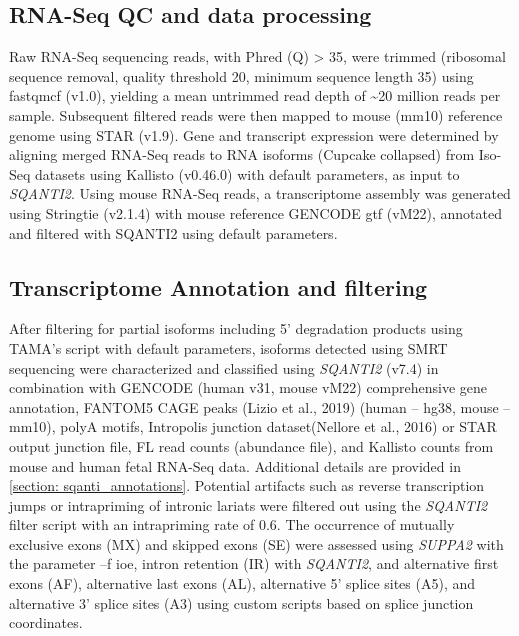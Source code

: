 \subsection{RNA-Seq QC and data processing}
Raw RNA-Seq sequencing reads, with Phred (Q) > 35, were trimmed (ribosomal sequence removal, quality threshold 20, minimum sequence length 35) using fastqmcf (v1.0), yielding a mean untrimmed read depth of \textasciitilde20 million reads per sample. Subsequent filtered reads were then mapped to mouse (mm10) reference genome using STAR\cite{Dobin2013} (v1.9). Gene and transcript expression were determined by aligning merged RNA-Seq reads to RNA isoforms (Cupcake collapsed) from Iso-Seq datasets using Kallisto\cite{Bray2016} (v0.46.0) with default parameters, as input to \textit{SQANTI2}. Using mouse RNA-Seq reads, a transcriptome assembly was generated using Stringtie\cite{Pertea2015} (v2.1.4) with mouse reference GENCODE gtf (vM22), annotated and filtered with SQANTI2 using default parameters. 

\subsection{Transcriptome Annotation and filtering}
After filtering for partial isoforms including 5’ degradation products using TAMA’s script with default parameters, isoforms detected using SMRT sequencing were characterized and classified using \textit{SQANTI2} (v7.4) in combination with GENCODE (human v31, mouse vM22) comprehensive gene annotation, FANTOM5 CAGE peaks (Lizio et al., 2019) (human – hg38, mouse – mm10), polyA motifs, Intropolis junction dataset(Nellore et al., 2016) or STAR output junction file, FL read counts (abundance file), and Kallisto counts from mouse and human fetal RNA-Seq data. Additional details are provided in \cref{section: sqanti_annotations}. Potential artifacts such as reverse transcription jumps or intrapriming of intronic lariats were filtered out using the \textit{SQANTI2} filter script with an intrapriming rate of 0.6. The occurrence of mutually exclusive exons (MX) and skipped exons (SE) were assessed using \textit{SUPPA2}\cite{Trincado2018} with the parameter –f ioe, intron retention (IR) with \textit{SQANTI2}, and alternative first exons (AF), alternative last exons (AL), alternative 5’ splice sites (A5), and alternative 3’ splice sites (A3) using custom scripts based on splice junction coordinates. 

